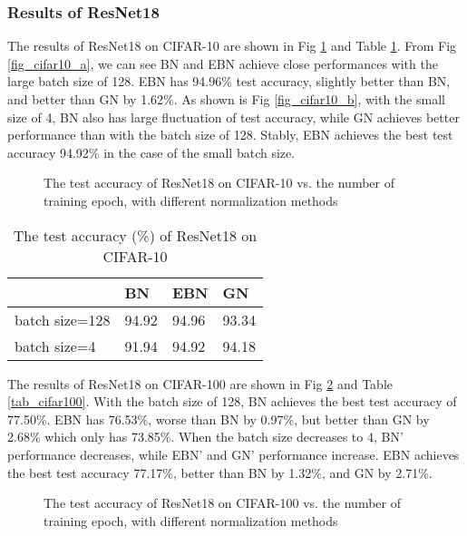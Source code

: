 \documentclass[runningheads]{llncs}
\begin{document}
\subsubsection{Results of ResNet18}
The results of ResNet18 on CIFAR-10 are shown in Fig \ref{fig_cifar10}  and Table \ref{tab_cifar10}. From Fig \ref{fig_cifar10_a}, we can see BN and EBN achieve close performances with the large batch size of 128. EBN has 94.96\%  test accuracy, slightly better than BN, and better than GN by 1.62\%. As shown is Fig \ref{fig_cifar10_b}, with the small size of 4, BN  also has large fluctuation of test accuracy, while GN achieves better performance than with the batch size of 128.  Stably, EBN achieves the best test accuracy 94.92\% in the case of the small batch size. 


\begin{figure}[!htb]
\centering
{}
\centering
{}
\caption{The test accuracy of ResNet18 on CIFAR-10 vs. the number of training epoch, with different normalization methods}
\label{fig_cifar10}
\end{figure}

\begin{table}[!htb]
\caption{The test accuracy (\%) of ResNet18 on CIFAR-10}
\label{tab_cifar10}
\centering
\begin{tabular}{l|lll}
\hline
  & BN & EBN & GN \\
\hline
batch size=128     & 94.92  & 94.96 & 93.34     \\
batch size=4       & 91.94  & 94.92 & 94.18     \\
\hline
\end{tabular}
\end{table}



The results of ResNet18 on CIFAR-100 are shown in Fig \ref{fig_cifar100}  and Table \ref{tab_cifar100}.
With the batch size of 128, BN achieves the best test accuracy of 77.50\%. EBN has 76.53\%, worse than BN by 0.97\%, but better than GN by 2.68\% which only has 73.85\%. When the batch size decreases to 4, BN' performance decreases, while EBN' and GN' performance increase. EBN achieves the best test accuracy 77.17\%, better than BN by 1.32\%, and GN by 2.71\%.

\begin{figure}[!htb]
\centering
{}
\centering
{}
\caption{The test accuracy of ResNet18 on CIFAR-100 vs. the number of training epoch, with different normalization methods}
\label{fig_cifar100}
\end{figure}
\end{document}
